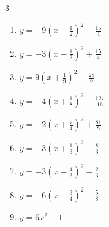 


\setcounter{quesnum}{33}

\begin{multicols}{3}
\begin{enumerate}
  \itemsep=5pt
  \item $\displaystyle y=-9\left( x-\frac{1}{2}\right)^{2}-\frac{15}{4}$


  \item $\displaystyle y=-3\left( x-\frac{1}{2}\right)^{2}+\frac{15}{4}$


  \item $\displaystyle y=9\left( x+\frac{1}{9}\right)^{2}-\frac{28}{9}$


  \item $\displaystyle y=-4\left( x+\frac{1}{8}\right)^{2}-\frac{127}{16}$


  \item $\displaystyle y=-2\left( x+\frac{7}{4}\right)^{2}+\frac{81}{8}$


  \item $\displaystyle y=-3\left( x+\frac{1}{3}\right)^{2}-\frac{8}{3}$


  \item $\displaystyle y=-3\left( x-\frac{4}{3}\right)^{2}-\frac{2}{3}$


  \item $\displaystyle y=-6\left( x-\frac{3}{4}\right)^{2}-\frac{5}{8}$


  \item $\displaystyle y=6x^{2}-1$


\end{enumerate}
\end{multicols}
